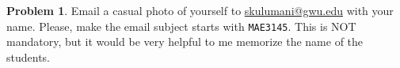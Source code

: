\documentclass[10pt]{article}
\renewcommand{\baselinestretch}{1.2}
\theoremstyle{definition}
\newtheorem{prob}{Problem}[section]
\begin{document}
\begin{prob}
Email a casual photo of yourself to \url{skulumani@gwu.edu} with your name. Please, make the email subject starts with \texttt{MAE3145}.  This is NOT mandatory, but it would be very helpful to me memorize the name of the students. 
\end{prob}

%
%
%
%
\end{document}
